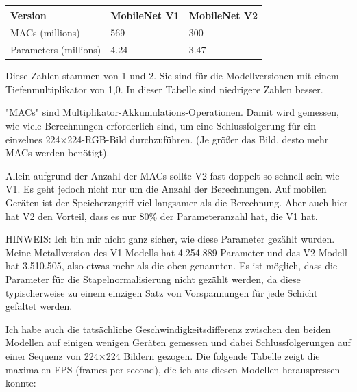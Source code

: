 \begin{tabular}{l|l|l}
Version                 & MobileNet V1 & MobileNet V2 \\ \hline
MACs (millions)         & 569          &  300 \\
Parameters (millions)   & 4.24         &  3.47\\
\end{tabular}


Diese Zahlen stammen von 1 und 2. Sie sind für die Modellversionen mit einem Tiefenmultiplikator von 1,0. In dieser Tabelle sind niedrigere Zahlen besser.

"MACs" sind Multiplikator-Akkumulations-Operationen. Damit wird gemessen, wie viele Berechnungen erforderlich sind, um eine Schlussfolgerung für ein einzelnes 224×224-RGB-Bild durchzuführen. (Je größer das Bild, desto mehr MACs werden benötigt).

Allein aufgrund der Anzahl der MACs sollte V2 fast doppelt so schnell sein wie V1. Es geht jedoch nicht nur um die Anzahl der Berechnungen. Auf mobilen Geräten ist der Speicherzugriff viel langsamer als die Berechnung. Aber auch hier hat V2 den Vorteil, dass es nur 80\% der Parameteranzahl hat, die V1 hat.

HINWEIS: Ich bin mir nicht ganz sicher, wie diese Parameter gezählt wurden. Meine Metallversion des V1-Modells hat 4.254.889 Parameter und das V2-Modell hat 3.510.505, also etwas mehr als die oben genannten. Es ist möglich, dass die Parameter für die Stapelnormalisierung nicht gezählt werden, da diese typischerweise zu einem einzigen Satz von Vorspannungen für jede Schicht gefaltet werden.

Ich habe auch die tatsächliche Geschwindigkeitsdifferenz zwischen den beiden Modellen auf einigen wenigen Geräten gemessen und dabei Schlussfolgerungen auf einer Sequenz von 224×224 Bildern gezogen. Die folgende Tabelle zeigt die maximalen FPS (frames-per-second), die ich aus diesen Modellen herauspressen konnte:

